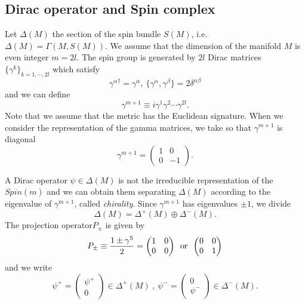 \documentclass[a4paper,pdftex,10pt]{report}
\begin{document}
\subsection{Dirac operator and Spin complex}

Let $\Delta(M)$ the section of the spin bundle $S(M)$, i.e. $\Delta(M)=\Gamma(M,S(M))$. We assume that the dimension of the manifold $M$ is even integer $m=2l$. The spin group is generated by $2l$ Dirac matrices $\{\gamma^{k}\}_{k=1,\cdots,2l}$  which satisfy
\begin{equation}
  {\gamma^{\alpha}}^{\dag}
  =
  \gamma^{\alpha}
  ,\ 
  \{\gamma^{\alpha},\gamma^{\beta}\}
  =
  2\delta^{\alpha\beta}
\end{equation} 
and we can define 
\begin{equation}
  \gamma^{m+1}
  \equiv
  i\gamma^{1}\gamma^{2}\cdots\gamma^{2l}
  .
\end{equation}
Note that we assume that the metric has the Euclidean signature. When we consider the representation of the gamma matrices, we take so that $\gamma^{m+1}$ is diagonal
\begin{equation}
  \gamma^{m+1}
  =
  \begin{pmatrix}
    1 & 0 \\
    0 & -1
  \end{pmatrix}
  .
  \label{eqn:chirality_operator}
\end{equation}

A Dirac operator $\psi\in\Delta(M)$ is not the irreducible representation of the $Spin(m)$ and we can obtain them separating $\Delta(M)$ according to the eigenvalue of $\gamma^{m+1}$, called \textit{chirality}. Since $\gamma^{m+1}$ has eigenvalues $\pm 1$, we divide 
\begin{equation}
  \Delta(M)
  =
  \Delta^{+}(M)
  \oplus
  \Delta^{-}(M)
  .
\end{equation}
The projection operator$P_{\pm}$ is given by 
\begin{equation}
  P_{\pm}
  \equiv
  \frac{1\pm \gamma^{5}}{2}
  =
  \begin{pmatrix}
    1 & 0 \\
    0 & 0
  \end{pmatrix}
  \hspace*{5pt}\textrm{or}\hspace*{5pt}
  \begin{pmatrix}
    0 & 0 \\
    0 & 1
  \end{pmatrix}
\end{equation}
and we write 
\begin{equation}
  \psi^{+}
  =
  \begin{pmatrix}
    \psi^{+} \\
    0
  \end{pmatrix}
  \in 
  \Delta^{+}(M)
  \ ,\ 
  \psi^{-}
  =
  \begin{pmatrix}
    0 \\
    \psi^{-}
  \end{pmatrix}
  \in 
  \Delta^{-}(M)
  .
\end{equation}
\end{document}
